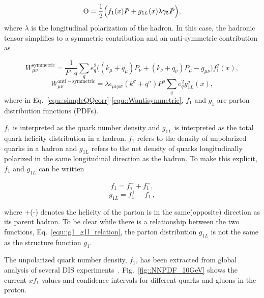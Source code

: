 \begin{equation}
  \label{equ::simpleQQcorr}
  \Theta = \frac{1}{2}
  \Big(
  f_1(x)\slashed{P} +
  g_{1L}(x)\lambda\gamma_5\slashed{P}
  \Big),
\end{equation}
\noindent
where $\lambda$ is the longitudinal polarization of the hadron.  In this case,
the hadronic tensor simplifies to a symmetric contribution and an anti-symmetric
contribution as~\cite{Barone:2001sp}

\begin{equation}
  \label{equ::simpleHadronTensor}
  W^{\mathrm{symmetric}}_{\mu\nu} = \frac{1}{P\cdot q} \sum_q e_q^2
  \Big( (k_{\mu}+q_{\mu})P_{\nu} + (k_{\nu}+q_{\nu})P_{\mu}-g_{\mu\nu}
  \Big) f_1^q(x),
\end{equation}
\begin{equation}
  W^{\mathrm{anti-symmetric}}_{\mu\nu} =
  \lambda\epsilon_{\mu\nu\rho\sigma}(k^{\sigma}+q^{\sigma})P^{\rho}\sum_q e^2_q
  g^q_{1L}(x),
  \label{equ::Wantisymmetric}
\end{equation}
\noindent
where in Eq.~\ref{equ::simpleQQcorr}-\ref{equ::Wantisymmetric}, $f_1$ and $g_1$
are parton distribution functions (PDFs).

$f_1$ is interpreted as the quark number density and $g_{1L}$ is interpreted as
the total quark helicity distribution in a hadron.  $f_1$ refers to the density
of unpolarized quarks in a hadron and $g_{1L}$ refers to the net density of
quarks longitudinally polarized in the same longitudinal direction as the
hadron.  To make this explicit, $f_1$ and $g_{1L}$ can be written

\begin{multicols}{2}
  \noindent
  \begin{equation}
    f_1 = f_1^{+} + f_1^{-},
  \end{equation}
  \begin{equation}
    g_{1L} = f_1^{+} - f_1^{-},
  \end{equation}
\end{multicols}
\noindent
where +(-) denotes the helicity of the parton is in the same(opposite) direction
as its parent hadron.  To be clear while there is a relationship between the two
functions, Eq.~\ref{equ::g1_g1l_relation}, the parton distribution $g_{1L}$ is
not the same as the structure function $g_1$.

The unpolarized quark number density, $f_1$, has been extracted from global
analysis of several DIS experiments~\cite{Rojo_2015}.
Fig.~\ref{fig::NNPDF_10GeV} shows the current $xf_1$ values and confidence
intervals for different quarks and gluons in the proton.

